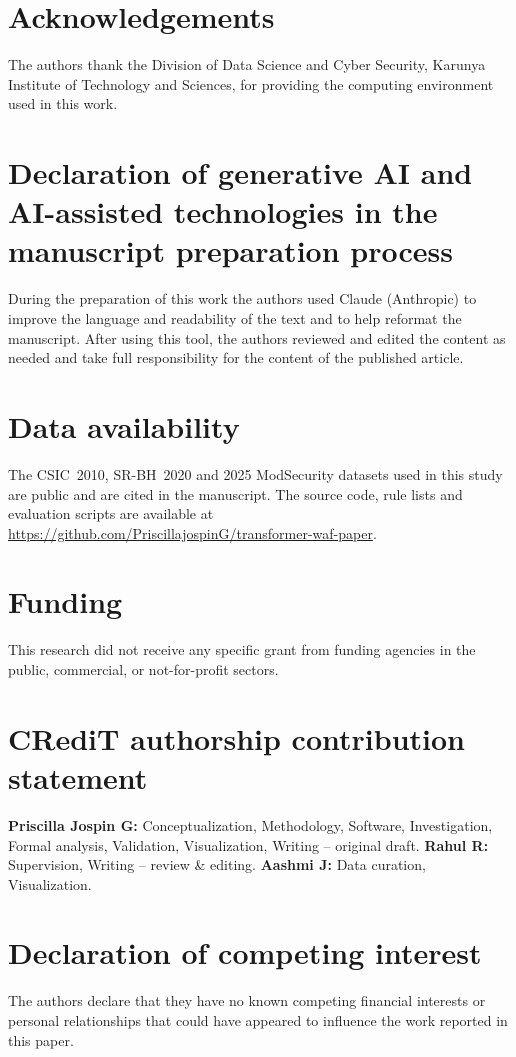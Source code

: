 \documentclass[preprint,11pt]{elsarticle}
\begin{document}
\section*{Acknowledgements}
The authors thank the Division of Data Science and Cyber Security, Karunya Institute of Technology and Sciences, for providing the computing environment used in this work.

\section*{Declaration of generative AI and AI-assisted technologies in the manuscript preparation process}
During the preparation of this work the authors used Claude (Anthropic) to improve the language and readability of the text and to help reformat the manuscript. After using this tool, the authors reviewed and edited the content as needed and take full responsibility for the content of the published article.

\section*{Data availability}
The CSIC~2010, SR-BH~2020 and 2025 ModSecurity datasets used in this study are public and are cited in the manuscript. The source code, rule lists and evaluation scripts are available at \url{https://github.com/PriscillajospinG/transformer-waf-paper}.

\section*{Funding}
This research did not receive any specific grant from funding agencies in the public, commercial, or not-for-profit sectors.

\section*{CRediT authorship contribution statement}
\textbf{Priscilla Jospin G:} Conceptualization, Methodology, Software, Investigation, Formal analysis, Validation, Visualization, Writing -- original draft. \textbf{Rahul R:} Supervision, Writing -- review \& editing. \textbf{Aashmi J:} Data curation, Visualization.

\section*{Declaration of competing interest}
The authors declare that they have no known competing financial interests or personal relationships that could have appeared to influence the work reported in this paper.



\end{document}
